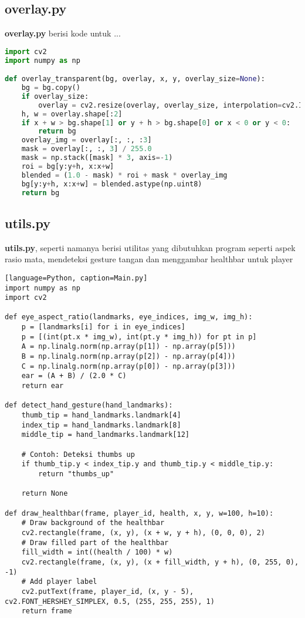 \documentclass[11pt,a4paper]{article}
\begin{document}
\subsection{overlay.py}
\textbf{overlay.py} berisi kode untuk ...
\begin{lstlisting}[language=Python, caption=Main.py]
import cv2
import numpy as np

def overlay_transparent(bg, overlay, x, y, overlay_size=None):
    bg = bg.copy()
    if overlay_size:
        overlay = cv2.resize(overlay, overlay_size, interpolation=cv2.INTER_AREA)
    h, w = overlay.shape[:2]
    if x + w > bg.shape[1] or y + h > bg.shape[0] or x < 0 or y < 0:
        return bg
    overlay_img = overlay[:, :, :3]
    mask = overlay[:, :, 3] / 255.0
    mask = np.stack([mask] * 3, axis=-1)
    roi = bg[y:y+h, x:x+w]
    blended = (1.0 - mask) * roi + mask * overlay_img
    bg[y:y+h, x:x+w] = blended.astype(np.uint8)
    return bg
\end{lstlisting}

\subsection{utils.py}
\textbf{utils.py}, seperti namanya berisi utilitas yang dibutuhkan program seperti aspek rasio mata, mendeteksi gesture tangan dan menggambar healthbar untuk player
\begin{lstlisting}
[language=Python, caption=Main.py]
import numpy as np
import cv2

def eye_aspect_ratio(landmarks, eye_indices, img_w, img_h):
    p = [landmarks[i] for i in eye_indices]
    p = [(int(pt.x * img_w), int(pt.y * img_h)) for pt in p]
    A = np.linalg.norm(np.array(p[1]) - np.array(p[5]))
    B = np.linalg.norm(np.array(p[2]) - np.array(p[4]))
    C = np.linalg.norm(np.array(p[0]) - np.array(p[3]))
    ear = (A + B) / (2.0 * C)
    return ear

def detect_hand_gesture(hand_landmarks):
    thumb_tip = hand_landmarks.landmark[4]
    index_tip = hand_landmarks.landmark[8]
    middle_tip = hand_landmarks.landmark[12]

    # Contoh: Deteksi thumbs up
    if thumb_tip.y < index_tip.y and thumb_tip.y < middle_tip.y:
        return "thumbs_up"

    return None

def draw_healthbar(frame, player_id, health, x, y, w=100, h=10):
    # Draw background of the healthbar
    cv2.rectangle(frame, (x, y), (x + w, y + h), (0, 0, 0), 2)
    # Draw filled part of the healthbar
    fill_width = int((health / 100) * w)
    cv2.rectangle(frame, (x, y), (x + fill_width, y + h), (0, 255, 0), -1)
    # Add player label
    cv2.putText(frame, player_id, (x, y - 5), cv2.FONT_HERSHEY_SIMPLEX, 0.5, (255, 255, 255), 1)
    return frame
\end{lstlisting}
\end{document}
